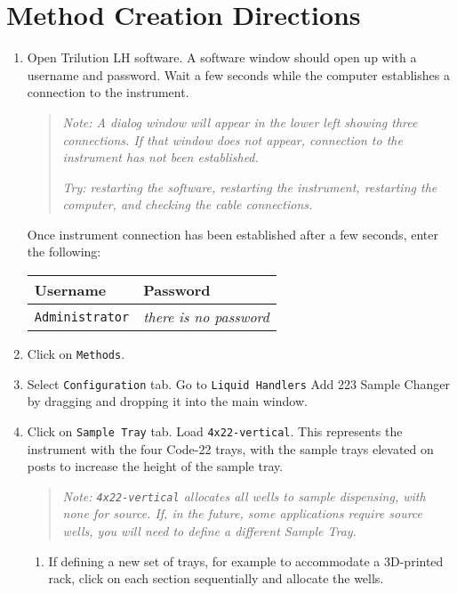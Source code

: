 \documentclass[11pt, oneside]{article}   	%
\begin{document}
\section*{Method Creation Directions}
\begin{enumerate}
\item Open Trilution LH software. A software window should open up with a username and password. Wait a few seconds while the computer establishes a connection to the instrument.

\begin{quote}
	\emph{Note: A dialog window will appear in the lower left showing three connections. If that window does not appear, connection to the instrument has not been established.}
	
	\emph{Try: restarting the software, restarting the instrument, restarting the computer, and checking the cable connections.}
\end{quote}

Once instrument connection has been established after a few seconds, enter the following:
\begin{center}
\begin{tabular}{l l}
	\hline
	Username & Password \\
	\hline
	\hline
	\texttt{Administrator} & \emph{there is no password} \\
	\hline
\end{tabular}
\end{center}

\item Click on \texttt{Methods}.
\item Select \texttt{Configuration} tab. Go to  \texttt{Liquid Handlers} Add 223 Sample Changer by dragging and dropping it into the main window.
\item Click on \texttt{Sample Tray} tab. Load \texttt{4x22-vertical}. This represents the instrument with the four Code-22 trays, with the sample trays elevated on posts to increase the height of the sample tray.

\begin{quote}
	\emph{Note: \texttt{4x22-vertical} allocates all wells to sample dispensing, with none for source. If, in the future, some applications require source wells, you will need to define a different Sample Tray.}
\end{quote}


\begin{enumerate}
	\item If defining a new set of trays, for example to accommodate a 3D-printed rack, click on each section sequentially and allocate the wells.
\end{enumerate}


\end{enumerate}
\end{document}

